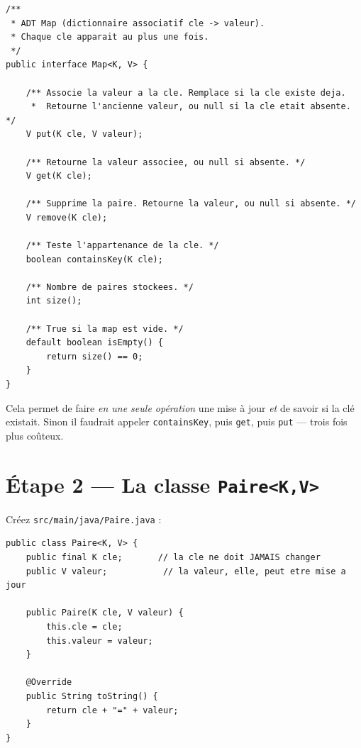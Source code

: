 \documentclass[11pt,a4paper]{article}
\begin{document}
\begin{lstlisting}[style=java]
/**
 * ADT Map (dictionnaire associatif cle -> valeur).
 * Chaque cle apparait au plus une fois.
 */
public interface Map<K, V> {

    /** Associe la valeur a la cle. Remplace si la cle existe deja.
     *  Retourne l'ancienne valeur, ou null si la cle etait absente. */
    V put(K cle, V valeur);

    /** Retourne la valeur associee, ou null si absente. */
    V get(K cle);

    /** Supprime la paire. Retourne la valeur, ou null si absente. */
    V remove(K cle);

    /** Teste l'appartenance de la cle. */
    boolean containsKey(K cle);

    /** Nombre de paires stockees. */
    int size();

    /** True si la map est vide. */
    default boolean isEmpty() {
        return size() == 0;
    }
}
\end{lstlisting}

\begin{infobox}
Cela permet de faire \emph{en une seule opération} une mise à jour \emph{et} de savoir si la clé existait. Sinon il faudrait appeler \texttt{containsKey}, puis \texttt{get}, puis \texttt{put} --- trois fois plus coûteux.
\end{infobox}

\section{Étape 2 --- La classe \texttt{Paire<K,V>}}

Créez \texttt{src/main/java/Paire.java} :

\begin{lstlisting}[style=java]
public class Paire<K, V> {
    public final K cle;       // la cle ne doit JAMAIS changer
    public V valeur;           // la valeur, elle, peut etre mise a jour

    public Paire(K cle, V valeur) {
        this.cle = cle;
        this.valeur = valeur;
    }

    @Override
    public String toString() {
        return cle + "=" + valeur;
    }
}
\end{lstlisting}
\end{document}
